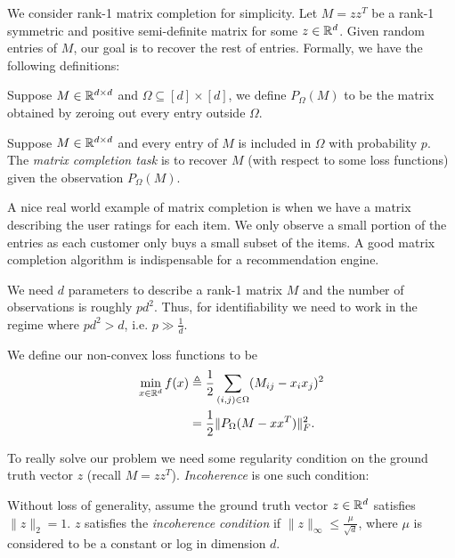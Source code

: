 

We consider rank-1 matrix completion for simplicity. Let $M = zz^T$ be a rank-1 symmetric and positive semi-definite matrix for some $z\in \mathbb R^d$. Given random entries of $M$, our goal is to recover the rest of entries. Formally, we have the following definitions:

\begin{definition}
Suppose $M\in \mathbb R^{d\times d}$ and $\Omega \subseteq [d] \times [d]$, we define $P_{\Omega}(M)$ to be the matrix obtained by zeroing out every entry outside $\Omega$. 
\end{definition}

\begin{definition}
Suppose $M\in \mathbb R^{d\times d}$ and every entry of $M$ is included in $\Omega$ with probability $p$. The \textit{matrix completion task} is to recover $M$ (with respect to some loss functions) given the observation $P_{\Omega}(M)$.
\end{definition}

A nice real world example of matrix completion is when we have a matrix describing the user ratings for each item. We only observe a small portion of the entries as each customer only buys a small subset of the items. A good matrix completion algorithm is indispensable for a recommendation engine. 

\begin{remark}
We need $d$ parameters to describe a rank-1 matrix $M$ and the number of observations is roughly $pd^2$. Thus, for identifiability we need to work in the regime where $pd^2 > d$, i.e. $p \gg \frac{1}{d}$. 
\end{remark}

We define our non-convex loss functions to be 
\begin{align}
    \min_{x \in \mathbb R^d} f(x) & \triangleq \frac{1}{2}\sum_{(i,j)\in \Omega}(M_{ij}-x_ix_j)^2 \\
     & = \frac{1}{2}\|P_{\Omega}(M-xx^T)\|_F^2.
\end{align}

To really solve our problem we need some regularity condition on the ground truth vector $z$ (recall $M = zz^T$). \textit{Incoherence} is one such condition:
\begin{definition}[Incoherence]
Without loss of generality, assume the ground truth vector $z\in\mathbb R^d$ satisfies $\|z\|_2 = 1$. $z$ satisfies the \textit{incoherence condition} if $\|z\|_{\infty} \leq \frac{\mu}{\sqrt{d}}$, where $\mu$ is considered to be a constant or log in dimension $d$. 
\end{definition}

